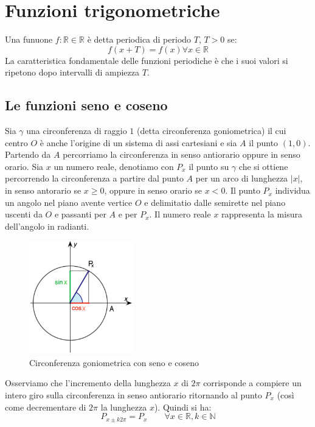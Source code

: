 \documentclass[11pt,a4paper,notitlepage]{report}
\let\numberset\mathbb
\newcommand{\N}{\numberset{N}}
\newcommand{\R}{\numberset{R}}
\begin{document}
\section{Funzioni trigonometriche}
Una funuone $f:\R \in \R$ è detta periodica di periodo $T$, $T>0$ se:
\[f(x+T)=f(x) \forall x \in \R\]
La caratteristica fondamentale delle funzioni periodiche è che i suoi valori si ripetono dopo intervalli di ampiezza $T$.

\subsection{Le funzioni seno e coseno}
Sia $\gamma$ una circonferenza di raggio $1$ (detta circonferenza goniometrica) il cui centro $O$ è anche l'origine di un sistema di assi cartesiani e sia $A$ il punto $(1,0)$.
Partendo da $A$ percorriamo la circonferenza in senso antiorario oppure in senso orario.
Sia $x$ un numero reale, denotiamo con $P_x$ il punto su $\gamma$ che si ottiene percorrendo la circonferenza a partire dal punto $A$ per un arco di lunghezza $|x|$, in senso antorario se $x \geq 0$, oppure in senso orario se $x<0$.
Il punto $P_x$ individua un angolo nel piano avente vertice $O$ e delimitatio dalle semirette nel piano uscenti da $O$ e passanti per $A$ e per $P_x$.
Il numero reale $x$ rappresenta la misura dell'angolo in radianti.

\begin{figure}
  \begin{center}
    \includegraphics[width=0.40\textwidth]{images/circonferenza.png}
  \end{center}
  \caption{Circonferenza goniometrica con seno e coseno}
\end{figure}


Osserviamo che l'incremento della lunghezza $x$ di $2\pi$ corrisponde a compiere un intero giro sulla circonferenza in senso antiorario ritornando al punto $P_x$ (così come decrementare di $2\pi$ la lunghezza $x$). Quindi si ha:
\[P_{x\pm k2\pi}=P_x \qquad \forall x \in \R, k \in \N\]
\end{document}
